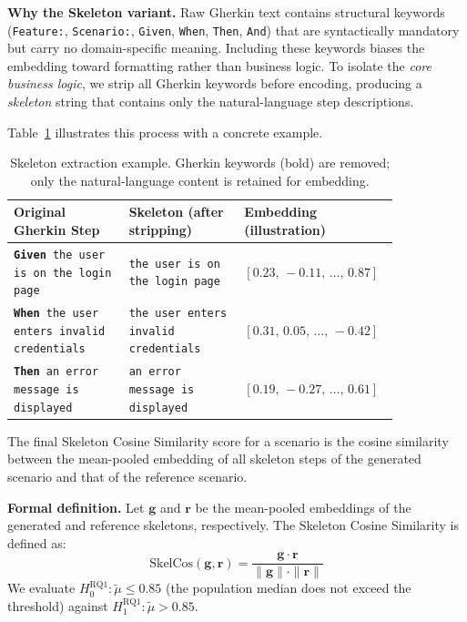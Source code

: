 \textbf{Why the Skeleton variant.}
Raw Gherkin text contains structural keywords (\texttt{Feature:}, \texttt{Scenario:},
\texttt{Given}, \texttt{When}, \texttt{Then}, \texttt{And}) that are syntactically
mandatory but carry no domain-specific meaning.
Including these keywords biases the embedding toward formatting rather than business logic.
To isolate the \emph{core business logic}, we strip all Gherkin keywords before encoding,
producing a \emph{skeleton} string that contains only the natural-language step descriptions.

Table~\ref{tab:skeleton-example} illustrates this process with a concrete example.

\begin{table}[h]
\centering
\caption{Skeleton extraction example. Gherkin keywords (bold) are removed;
only the natural-language content is retained for embedding.}
\label{tab:skeleton-example}
\renewcommand{\arraystretch}{1.3}
\begin{tabular}{p{0.28\linewidth} p{0.28\linewidth} p{0.28\linewidth}}
\toprule
\textbf{Original Gherkin Step} & \textbf{Skeleton (after stripping)} & \textbf{Embedding (illustration)} \\
\midrule
\texttt{\textbf{Given} the user is on the login page}
  & \texttt{the user is on the login page}
  & $[0.23,\,-0.11,\,\ldots,\,0.87]$ \\
\addlinespace
\texttt{\textbf{When} the user enters invalid credentials}
  & \texttt{the user enters invalid credentials}
  & $[0.31,\,0.05,\,\ldots,\,-0.42]$ \\
\addlinespace
\texttt{\textbf{Then} an error message is displayed}
  & \texttt{an error message is displayed}
  & $[0.19,\,-0.27,\,\ldots,\,0.61]$ \\
\bottomrule
\end{tabular}
\end{table}

The final Skeleton Cosine Similarity score for a scenario is the cosine similarity between
the mean-pooled embedding of all skeleton steps of the generated scenario and that of the
reference scenario.

\textbf{Formal definition.}
Let $\mathbf{g}$ and $\mathbf{r}$ be the mean-pooled embeddings of the generated and
reference skeletons, respectively.
The Skeleton Cosine Similarity is defined as:
\begin{equation}
  \text{SkelCos}(\mathbf{g}, \mathbf{r})
    = \frac{\mathbf{g} \cdot \mathbf{r}}{\|\mathbf{g}\| \cdot \|\mathbf{r}\|}
\label{eq:skelcos}
\end{equation}
We evaluate $H_0^{\text{RQ1}}: \tilde{\mu} \leq 0.85$ (the population median does not
exceed the threshold) against $H_1^{\text{RQ1}}: \tilde{\mu} > 0.85$.

